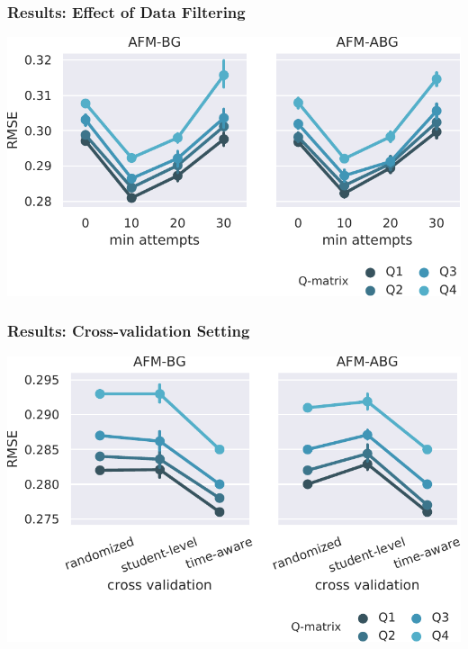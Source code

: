 \documentclass[bigger]{beamer}
\begin{document}
\begin{frame}
  \frametitle{Results: Effect of Data Filtering}

  \begin{center}
    \includegraphics[width=\linewidth]{student-filtering-effect}
  \end{center}
\end{frame}

\begin{frame}
  \frametitle{Results: Cross-validation Setting}

  \begin{center}
    \includegraphics[width=\linewidth]{cv-effect}
  \end{center}
\end{frame}
\end{document}
